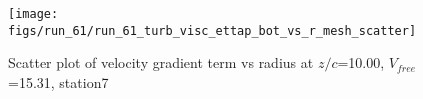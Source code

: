 \begin{figure}[H]
\centering
\texttt{[image: figs/run\_61/run\_61\_turb\_visc\_ettap\_bot\_vs\_r\_mesh\_scatter]}
\caption{Scatter plot of velocity gradient term vs radius at $z/c$=10.00, $V_{free}$=15.31, station7}
\label{fig:run_61_turb_visc_ettap_bot_vs_r_mesh_scatter}
\end{figure}


